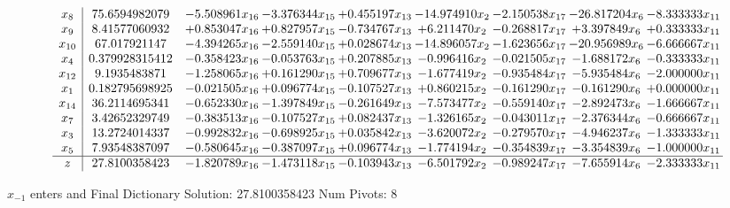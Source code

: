 \documentclass[10pt]{article}
\begin{document}
 \[\begin{array}{c| c c@{\hskip 2pt} c@{\hskip 2pt} c@{\hskip 2pt} c@{\hskip 2pt} c@{\hskip 2pt} c@{\hskip 2pt} c@{\hskip 2pt} }
 x_{8}   &  75.6594982079 & -5.508961 x_{16} & -3.376344 x_{15} & + 0.455197 x_{13} & -14.974910 x_{2} & -2.150538 x_{17} & -26.817204 x_{6} & -8.333333 x_{11}\\
 x_{9}   &  8.41577060932 & + 0.853047 x_{16} & + 0.827957 x_{15} & -0.734767 x_{13} & + 6.211470 x_{2} & -0.268817 x_{17} & + 3.397849 x_{6} & + 0.333333 x_{11}\\
 x_{10}   &  67.017921147 & -4.394265 x_{16} & -2.559140 x_{15} & + 0.028674 x_{13} & -14.896057 x_{2} & -1.623656 x_{17} & -20.956989 x_{6} & -6.666667 x_{11}\\
 x_{4}   &  0.379928315412 & -0.358423 x_{16} & -0.053763 x_{15} & + 0.207885 x_{13} & -0.996416 x_{2} & -0.021505 x_{17} & -1.688172 x_{6} & -0.333333 x_{11}\\
 x_{12}   &  9.1935483871 & -1.258065 x_{16} & + 0.161290 x_{15} & + 0.709677 x_{13} & -1.677419 x_{2} & -0.935484 x_{17} & -5.935484 x_{6} & -2.000000 x_{11}\\
 x_{1}   &  0.182795698925 & -0.021505 x_{16} & + 0.096774 x_{15} & -0.107527 x_{13} & + 0.860215 x_{2} & -0.161290 x_{17} & -0.161290 x_{6} & + 0.000000 x_{11}\\
 x_{14}   &  36.2114695341 & -0.652330 x_{16} & -1.397849 x_{15} & -0.261649 x_{13} & -7.573477 x_{2} & -0.559140 x_{17} & -2.892473 x_{6} & -1.666667 x_{11}\\
 x_{7}   &  3.42652329749 & -0.383513 x_{16} & -0.107527 x_{15} & + 0.082437 x_{13} & -1.326165 x_{2} & -0.043011 x_{17} & -2.376344 x_{6} & -0.666667 x_{11}\\
 x_{3}   &  13.2724014337 & -0.992832 x_{16} & -0.698925 x_{15} & + 0.035842 x_{13} & -3.620072 x_{2} & -0.279570 x_{17} & -4.946237 x_{6} & -1.333333 x_{11}\\
 x_{5}   &  7.93548387097 & -0.580645 x_{16} & -0.387097 x_{15} & + 0.096774 x_{13} & -1.774194 x_{2} & -0.354839 x_{17} & -3.354839 x_{6} & -1.000000 x_{11}\\
\hline
z    &  27.8100358423 & -1.820789 x_{16} & -1.473118 x_{15} & -0.103943 x_{13} & -6.501792 x_{2} & -0.989247 x_{17} & -7.655914 x_{6} & -2.333333 x_{11}\\
\end{array}\]


 $ x_{-1} $ enters and Final Dictionary
Solution:  27.8100358423
Num Pivots:  8
\end{document}
